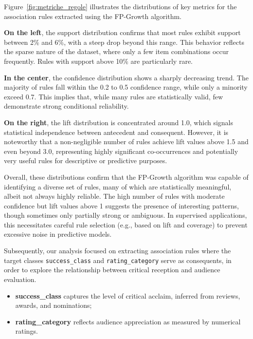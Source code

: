 \documentclass{article}
\begin{document}
Figure~\ref{fig:metriche_regole} illustrates the distributions of key metrics for the association rules extracted using the FP-Growth algorithm.

\textbf{On the left}, the support distribution confirms that most rules exhibit support between 2\% and 6\%, with a steep drop beyond this range. This behavior reflects the sparse nature of the dataset, where only a few item combinations occur frequently. Rules with support above 10\% are particularly rare.

\textbf{In the center}, the confidence distribution shows a sharply decreasing trend. The majority of rules fall within the 0.2 to 0.5 confidence range, while only a minority exceed 0.7. This implies that, while many rules are statistically valid, few demonstrate strong conditional reliability.

\textbf{On the right}, the lift distribution is concentrated around 1.0, which signals statistical independence between antecedent and consequent. However, it is noteworthy that a non-negligible number of rules achieve lift values above 1.5 and even beyond 3.0, representing highly significant co-occurrences and potentially very useful rules for descriptive or predictive purposes.

Overall, these distributions confirm that the FP-Growth algorithm was capable of identifying a diverse set of rules, many of which are statistically meaningful, albeit not always highly reliable. The high number of rules with moderate confidence but lift values above 1 suggests the presence of interesting patterns, though sometimes only partially strong or ambiguous. In supervised applications, this necessitates careful rule selection (e.g., based on lift and coverage) to prevent excessive noise in predictive models.

Subsequently, our analysis focused on extracting association rules where the target classes \texttt{success\_class} and \texttt{rating\_category} serve as consequents, in order to explore the relationship between critical reception and audience evaluation.

\begin{itemize}
    \item \textbf{success\_class} captures the level of critical acclaim, inferred from reviews, awards, and nominations;
    \item \textbf{rating\_category} reflects audience appreciation as measured by numerical ratings.
\end{itemize}
\end{document}
